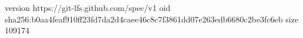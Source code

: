 version https://git-lfs.github.com/spec/v1
oid sha256:b0aa4feaf910ff23fd7da2d4caee46c8c7f3861dd07e263edb6680c2be3fc6eb
size 109174
